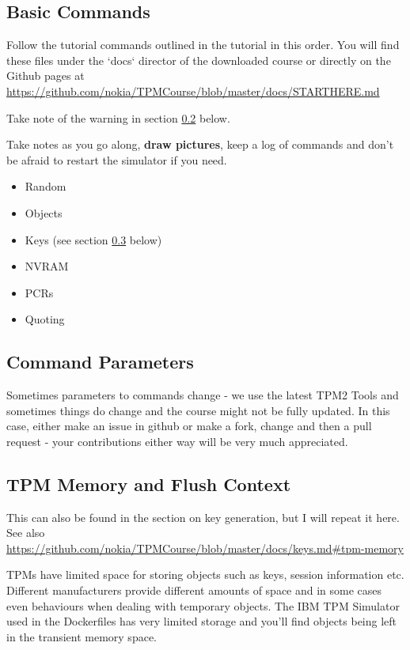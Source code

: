 \documentclass[11pt,a4paper]{article}
\begin{document}
\subsection{Basic Commands}
Follow the tutorial commands outlined in the tutorial in this order. You will find these files under the `docs` director of the downloaded course or directly on the Github pages at \url{https://github.com/nokia/TPMCourse/blob/master/docs/STARTHERE.md}

Take note of the warning in section \ref{commandparameters} below.

Take notes as you go along, \textbf{draw pictures}, keep a log of commands and don't be afraid to restart the simulator if you need. 

\begin{itemize}
\item Random
\item Objects
\item Keys  (see section \ref{flush} below)
\item NVRAM
\item PCRs
\item Quoting
\end{itemize}

\subsection{Command Parameters}\label{commandparameters}
Sometimes parameters to commands change - we use the latest TPM2 Tools and sometimes things do change and the course might not be fully updated. In this case, either make an issue in github or make a fork, change and then a pull request - your contributions either way will be very much appreciated.


\subsection{TPM Memory and Flush Context}\label{flush}
This can also be found in the section on key generation, but I will repeat it here. See also \url{https://github.com/nokia/TPMCourse/blob/master/docs/keys.md#tpm-memory}

TPMs have limited space for storing objects such as keys, session information etc. Different manufacturers provide different amounts of space and in some cases even behaviours when dealing with temporary objects. The IBM TPM Simulator used in the Dockerfiles has very limited storage and you'll find objects being left in the transient memory space.
\end{document}
